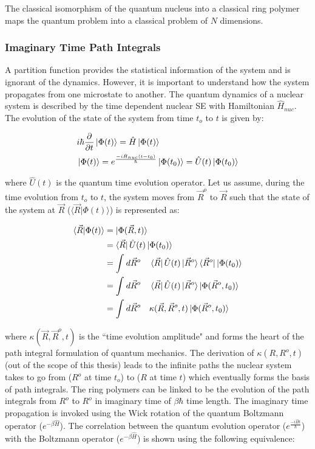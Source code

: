  \noindent The classical isomorphism of the quantum nucleus into a classical ring polymer maps the quantum problem into a classical problem of $N$ dimensions. 


\subsubsection*{Imaginary Time Path Integrals}

\noindent A partition function provides the statistical information of the system and is ignorant of the dynamics. However, it is important to understand how the system propagates from one microstate to another. The quantum dynamics of a nuclear system is described by the time dependent nuclear SE with Hamiltonian $\hat{H}_{nuc}$. The evolution of the state of the system from time $t_o$ to $t$ is given by: 

\begin{align}
    \label{QPF-7}
    &i\hbar \frac{\partial}{\partial t}\ket{\Phi(t)}=\hat{H}\ket{\Phi(t)}\\
    &\ket{\Phi(t)} = e^{\frac{-i\hat{H}_{nuc}(t-t_{0})}{\hbar}}\ket{\Phi(t_{0})}=\hat{U}(t)\ket{\Phi(t_{0})}
\end{align}

\noindent where $\hat{U}(t)$ is the quantum time evolution operator. Let us assume, during the time evolution from $t_o$ to $t$, the system moves from $\vec{R}^o$ to $\vec{R}$ such that the state of the system at $\vec{R}$ ($\langle \vec{R} | \Phi(t)\rangle$) is represented as:

\begin{align}
    \label{QPF-8}
      \langle \vec{R} | \Phi(t)\rangle &= \ket{\Phi(\vec{R},t)}\notag\\
      &=\bra{\vec{R}}\hat{U}(t)\ket{\Phi(t_{0})}\notag\\
      &=\int_{}^{}d\vec{R}^o\quad \bra{\vec{R}}\hat{U}(t)\ket{\vec{R}^o}\bra{\vec{R}^o}\ket{\Phi(t_{0})}\notag\\
      &=\int_{}^{}d\vec{R}^o\quad \bra{\vec{R}}\hat{U}(t)\ket{\vec{R}^o}\ket{\Phi(\vec{R}^{o},t_{0})}\notag\\
      &=\int_{}^{}d\vec{R}^o\quad \kappa(\vec{R},\vec{R}^o,t)\ket{\Phi(\vec{R}^{o},t_{0})}
\end{align}

\noindent where $\kappa(\vec{R},\vec{R}^o,t)$ is the ``time evolution amplitude" and forms the heart of the path integral formulation of quantum mechanics. The derivation of $\kappa(R,R^o,t)$ (out of the scope of this thesis) leads to the infinite paths the nuclear system takes to go from ($R^o$ at time $t_o$) to ($R$ at time $t$) which eventually forms the basis of path integrals. The ring polymers can be linked to be the evolution of the path integrals from $R^o$ to $R^o$ in imaginary time  of $\beta\hbar$ time length. The imaginary time propagation is invoked using the Wick rotation of the quantum Boltzmann operator ($e^{-\beta \hat{H}}$). The correlation between the quantum evolution operator ($e^{\frac{-i\hat{H}t}{\hbar}}$) with the Boltzmann operator ($e^{-\beta \hat{H}}$) is shown using the following equivalence:


